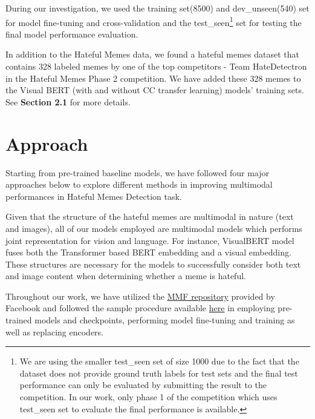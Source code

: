 \documentclass[10pt,twocolumn,letterpaper]{article}
\begin{document}
During our investigation, we used the training set(8500) and dev\_unseen(540) set for model fine-tuning and cross-validation and the test\_seen\footnote{We are using the smaller test\_seen set of size 1000 due to the fact that the dataset does not provide ground truth labels for test sets and the final test performance can only be evaluated by submitting the result to the competition. In our work, only phase 1 of the competition which uses test\_seen set to evaluate the final performance is available.} set for testing the final model performance evaluation.

In addition to the Hateful Memes data, we found a hateful memes dataset that contains 328 labeled memes by one of the top competitors - Team HateDetectron in the Hateful Memes Phase 2 competition. We have added these 328 memes to the Visual BERT (with and without CC transfer learning) models’ training sets. See \textbf{Section 2.1} for more details.

\section{Approach}
Starting from pre-trained baseline models, we have followed four major approaches below to explore different methods in improving multimodal performances in Hateful Memes Detection task.

Given that the structure of the hateful memes are multimodal in nature (text and images), all of our models employed are multimodal models which performs joint representation for vision and language. For instance, VisualBERT model fuses both the Transformer based BERT embedding and a visual embedding. ~\cite{Authors5} These structures are necessary for the models to successfully consider both text and image content when determining whether a meme is hateful. 

Throughout our work, we have utilized the \href{https://github.com/facebookresearch/mmf}{MMF repository} provided by Facebook and followed the sample procedure available \href{https://colab.research.google.com/github/facebookresearch/mmf/blob/notebooks/notebooks/mmf_hm_example.ipynb#scrollTo=ulosPHAE-eto}{here} in employing pre-trained models and checkpoints, performing model fine-tuning and training as well as replacing encoders.
\end{document}
